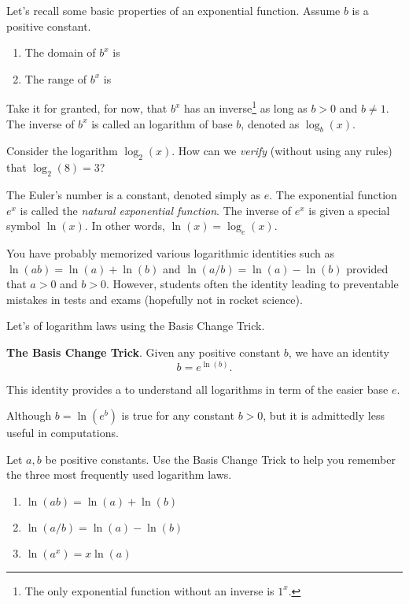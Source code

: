 \documentclass[../main.tex]{subfiles}
\begin{document}
Let's recall some basic properties of an exponential function.  Assume \(b\) is a positive constant. 
\begin{enumerate}[itemsep={1ex}]
  \item The domain of \(b^{x}\) is 
  \item The range of \(b^{x}\) is 
\end{enumerate}



Take it for granted, for now, that \(b^{x}\) has an inverse\footnote{The only exponential function without an inverse is \(1^{x}\).} as long as \(b > 0\) and \(b \ne 1\).  The inverse of \(b^{x}\) is called an logarithm of base \(b\), denoted as \(\log_{b}(x)\).  

\faComment{} Consider the logarithm \(\log_{2}(x)\). How can we \emph{verify} (without using any rules) that \(\log_{2}(8) = 3\)?

The Euler's number is a  constant, denoted simply as \(e\). The exponential function \(e^{x}\) is called the \emph{natural exponential function}. The inverse of \(e^{x}\) is given a special symbol \(\ln(x)\). In other words, \(\ln(x) = \log_{e}(x)\).


You have probably memorized various logarithmic identities such as \(\ln(ab) = \ln(a) + \ln(b)\) and \(\ln(a/b) = \ln(a) - \ln(b)\) provided that \(a > 0\) and \(b > 0\). However, students often  the identity leading to preventable mistakes in tests and exams (hopefully not in rocket science).

Let's  of logarithm laws using the Basis Change Trick. 

\begin{mdframed}[style=simple]
  \textbf{The Basis Change Trick}. Given any positive constant \(b\), we have an identity
  \[
    b = e^{\ln(b)}.
  \]

  \faStar{} This identity provides a  to understand all logarithms in term of the easier base \(e\).
\end{mdframed}

Although \(b = \ln(e^{b})\) is true for any constant \(b > 0\), but it is admittedly less useful in computations. 


\begin{example}
  Let \(a,b\) be positive constants. Use the Basis Change Trick to help you remember the three most frequently used logarithm laws.
  \begin{enumerate}[topsep={0in}, itemsep={1ex}]
    \item \(\ln(ab) = \ln(a) + \ln(b) \)
    \item \(\ln(a/b) = \ln(a) - \ln(b) \)
    \item \(\ln(a^{x}) = x \ln(a) \)
  \end{enumerate}
\end{example}
\end{document}
